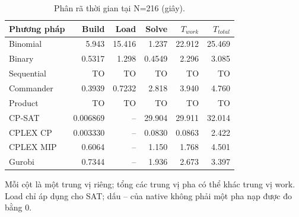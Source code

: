 \begin{table}[pos=H]
\centering
\small
\caption{Phân rã thời gian tại N=216 (giây).}
\label{tab:phase_216}
\setlength{\tabcolsep}{4pt}
\begin{tabular}{@{}lrrrrr@{}}
\toprule
Phương pháp & Build & Load & Solve & $T_{work}$ & $T_{total}$ \\
\midrule
Binomial & 5.943 & 15.416 & 1.237 & 22.912 & 25.469 \\
Binary & 0.5317 & 1.298 & 0.4549 & 2.296 & 3.085 \\
Sequential & TO & TO & TO & TO & TO \\
Commander & 0.3939 & 0.7232 & 2.818 & 3.940 & 4.760 \\
Product & TO & TO & TO & TO & TO \\
CP-SAT & 0.006869 & -- & 29.904 & 29.911 & 32.014 \\
CPLEX CP & 0.003330 & -- & 0.0830 & 0.0863 & 2.422 \\
CPLEX MIP & 0.6064 & -- & 1.150 & 1.768 & 4.501 \\
Gurobi & 0.7344 & -- & 1.936 & 2.673 & 3.397 \\
\bottomrule
\end{tabular}
\par\smallskip\begin{minipage}{\linewidth}\footnotesize Mỗi cột là một trung vị riêng; tổng các trung vị pha có thể khác trung vị work. Load chỉ áp dụng cho SAT; dấu -- của native không phải một pha nạp được đo bằng 0.\end{minipage}
\end{table}
